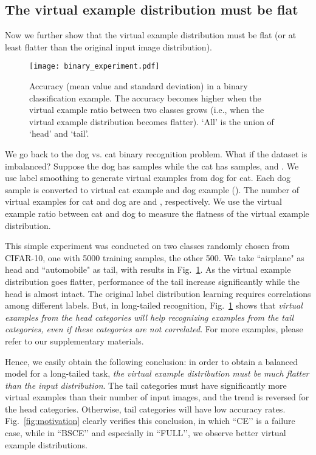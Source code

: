 \documentclass[10pt,twocolumn,letterpaper]{article}
\begin{document}
\subsection{The virtual example distribution must be flat}\label{sec:gen_ve_must_be_flat}

Now we further show that the virtual example distribution must be flat (or at least flatter than the original input image distribution). 

\begin{figure}
   \centering
   \texttt{[image: binary\_experiment.pdf]}
   \caption{Accuracy (mean value and standard deviation) in a binary classification example. The accuracy becomes higher when the virtual example ratio between two classes grows (i.e., when the virtual example distribution becomes flatter). `All' is the union of `head' and `tail'.}
   \label{fig:binary_experiment}
\end{figure}

We go back to the dog vs. cat binary recognition problem. What if the dataset is imbalanced? Suppose the dog has  samples while the cat has  samples, and . We use label smoothing to generate virtual examples from dog for cat. Each dog sample is converted to  virtual cat example and  dog example (). The number of virtual examples for cat and dog are  and , respectively. We use the virtual example ratio between cat and dog to measure the flatness of the virtual example distribution.

This simple experiment was conducted on two classes randomly chosen from CIFAR-10, one with 5000 training samples, the other 500. We take ``airplane"  as head and ``automobile" as tail, with results in Fig.~\ref{fig:binary_experiment}. As the virtual example distribution goes flatter, performance of the tail increase significantly while the head is almost intact. The original label distribution learning requires correlations among different labels. But, in long-tailed recognition, Fig.~\ref{fig:binary_experiment} shows that \emph{virtual examples from the head categories will help recognizing examples from the tail categories, even if these categories are \emph{not} correlated}. For more examples, please refer to our supplementary materials. 

Hence, we easily obtain the following conclusion: in order to obtain a balanced model for a long-tailed task, \emph{the virtual example distribution must be much flatter than the input distribution}. The tail categories must have significantly more virtual examples than their number of input images, and the trend is reversed for the head categories. Otherwise, tail categories will have low accuracy rates. Fig.~\ref{fig:motivation} clearly verifies this conclusion, in which ``CE’’ is a failure case, while in ``BSCE’’ and especially in ``FULL’’, we observe better virtual example distributions.
\end{document}
